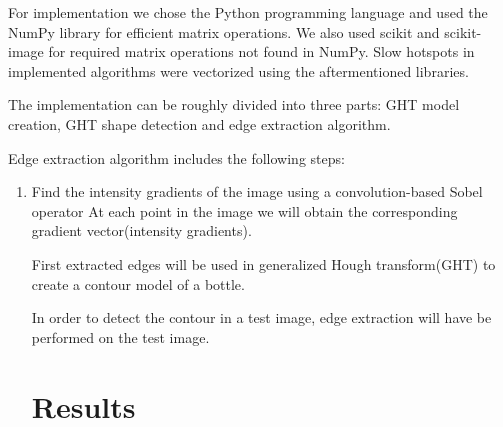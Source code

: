 \documentclass[letterpaper,12pt]{article}
\begin{document}
For implementation we chose the Python programming language and used the NumPy library
for efficient matrix operations.  We also used scikit and scikit-image for required
matrix operations not found in NumPy.  Slow hotspots in implemented algorithms
were vectorized using the aftermentioned libraries.

The implementation can be roughly divided into three parts: GHT model creation, GHT shape detection and edge extraction algorithm.

Edge extraction algorithm includes the following steps:

\begin{enumerate}
    \item Find the intensity gradients of the image using a convolution-based Sobel operator At each point in the image we will obtain the corresponding gradient vector(intensity gradients).


First extracted edges will be used in generalized Hough transform(GHT) to create a contour model of a bottle.


In order to detect the contour in a test image, edge extraction will have be performed on the test image. 


\section{Results}


\end{enumerate}
\end{document}
